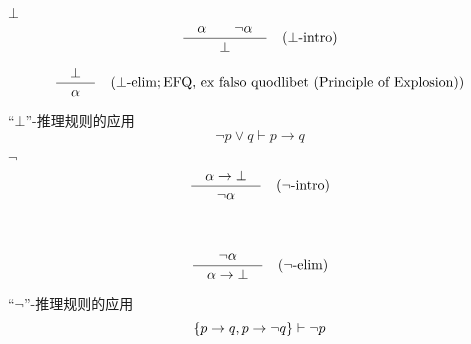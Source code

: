 \begin{frame}{$\bot$}
  \[
    \frac{\quad\alpha \qquad \lnot \alpha\quad}{\quad\bot\quad} \quad (\bot\text{-intro})
  \]

  \[
    \frac{\quad\bot\quad}{\quad\alpha\quad} \quad (\bot\text{-elim}; \text{EFQ, ex falso quodlibet (Principle of Explosion)})
  \]
\end{frame}

\begin{frame}{}
  \begin{exampleblock}{``$\bot$''-推理规则的应用}
    \[
      \lnot p \lor q \vdash p \to q
    \]
  \end{exampleblock}

\end{frame}

\begin{frame}{$\lnot$}
  \begin{gather*}
    \frac{\quad\alpha \to \bot\quad}{\quad\lnot \alpha\quad} \quad (\lnot\text{-intro}) \\[35pt]
    \frac{\quad\lnot \alpha\quad}{\quad\alpha \to \bot\quad} \quad (\lnot\text{-elim})
  \end{gather*}
\end{frame}

\begin{frame}{}
  \begin{exampleblock}{``$\lnot$''-推理规则的应用}
    \[
      \{p \to q, p \to \lnot q\} \vdash \lnot p
    \]
  \end{exampleblock}

\end{frame}

